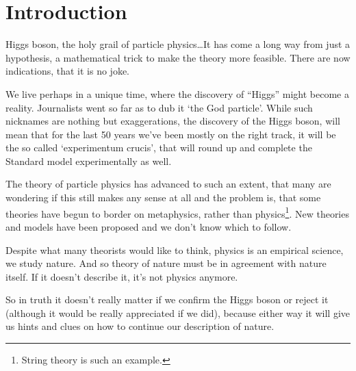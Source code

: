 \section{Introduction}
Higgs boson, the holy grail of particle physics\ldots It has come a long way from just a hypothesis, a
mathematical trick to make the theory more feasible. There are now indications, that it is no joke.

We live perhaps in a unique time, where the discovery of ``Higgs'' might become a reality.
Journalists went so far as to dub it `the God particle'. While such nicknames are nothing but exaggerations, the
discovery of the Higgs boson, will mean that for the last 50 years we've been mostly on the right track, it
will be the so called `experimentum crucis', that will round up and complete the Standard model experimentally
as well.

The theory of particle physics has advanced to such an extent, that many are wondering if this still makes any
sense at all and the 
problem is, that some theories have begun to border on metaphysics, rather than physics\footnote{String theory is such an example.}.
New theories and models have been proposed and we don't know which to follow.

Despite what many theorists would like to think, physics is an empirical science, we study nature. And so theory of nature must be
in agreement with nature itself. If it doesn't describe it, it's not physics anymore.

So in truth it doesn't really matter if we confirm the Higgs boson or reject it (although it would be really
appreciated if we did), because either way it will give us hints and clues on how to continue our description
of nature.
